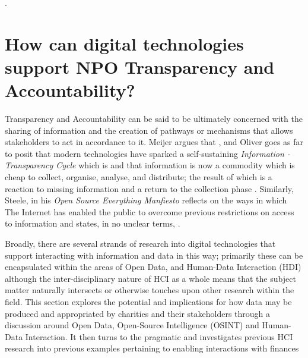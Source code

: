 %
.
%
%
\section{How can digital technologies support NPO Transparency and Accountability?}



Transparency and Accountability can be said to be ultimately concerned with the sharing of information and the creation of pathways or mechanisms that allows stakeholders to act in accordance to it. Meijer argues that  \cite{meijer_understanding_2009}, and Oliver goes as far to posit that modern technologies have sparked a self-sustaining \textit{Information - Transparency Cycle} which is  and that information is now a commodity which is cheap to collect, organise, analyse, and distribute; the result of which is a reaction to missing information and a return to the collection phase \cite{oliver_what_2004}. Similarly, Steele, in his \textit{Open Source Everything Manfiesto} reflects on the ways in which The Internet has enabled the public to overcome previous restrictions on access to information and states, in no unclear terms,  \cite{steele_open-source_2012}.

Broadly, there are several strands of research into digital technologies that support interacting with information and data in this way; primarily these can be encapsulated within the areas of Open Data, and Human-Data Interaction (HDI) although the inter-disciplinary nature of HCI as a whole means that the subject matter naturally intersects or otherwise touches upon other research within the field. This section explores the potential and implications for how data may be produced and appropriated by charities and their stakeholders through a discussion around Open Data, Open-Source Intelligence (OSINT) and Human-Data Interaction. It then turns to the pragmatic and investigates previous HCI research into previous examples pertaining to enabling interactions with finances


